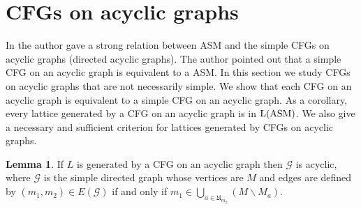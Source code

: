 \documentclass{article}
\theoremstyle{definition}
\newtheorem{lem}{Lemma}
\begin{document}
\section{CFGs on acyclic graphs}
\label{fifth section}
In \cite{Mag03} the author gave a strong relation between ASM and the simple CFGs on acyclic graphs (directed acyclic graphs). The author pointed out that a simple CFG on an acyclic graph is equivalent to a ASM. In this section we study CFGs on acyclic graphs that are not necessarily simple. We show that each CFG on an acyclic graph is equivalent to a simple CFG on an acyclic graph. As a corollary, every lattice generated by a CFG on an acyclic graph is in ${\rm L(ASM)}$. We also give a necessary and sufficient criterion for lattices generated by CFGs on acyclic graphs.

\begin{lem}
\label{CFGs on acyclic graphs}
If $L$ is generated by a CFG on an acyclic graph then $\mathcal{G}$ is acyclic, where $\mathcal{G}$ is the simple directed graph whose vertices are $M$ and edges are defined by $(m_1,m_2)\in E(\mathcal{G})$ if and only if $m_1 \in \underset{a \in \mathfrak{U}_{m_2}}{\bigcup}(M\backslash M_a)$.
\end{lem}
\end{document}
